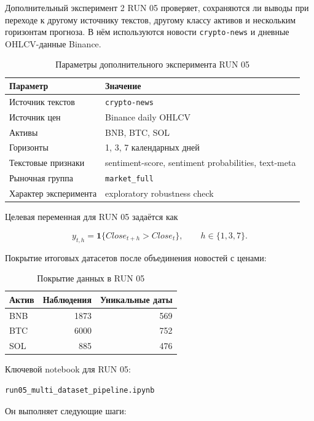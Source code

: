 Дополнительный эксперимент 2 RUN 05 проверяет, сохраняются ли выводы при переходе к другому источнику текстов, другому классу активов и нескольким горизонтам прогноза. В нём используются новости \texttt{crypto-news} и дневные OHLCV-данные Binance.

\begin{table}[htbp]
\centering
\begin{tabular}{ll}
\toprule
Параметр & Значение \\
\midrule
Источник текстов & \texttt{crypto-news} \\
Источник цен & Binance daily OHLCV \\
Активы & BNB, BTC, SOL \\
Горизонты & 1, 3, 7 календарных дней \\
Текстовые признаки & sentiment-score, sentiment probabilities, text-meta \\
Рыночная группа & \texttt{market\_full} \\
Характер эксперимента & exploratory robustness check \\
\bottomrule
\end{tabular}
\caption{Параметры дополнительного эксперимента RUN 05}
\label{tab:appendix_run05_params}
\end{table}

Целевая переменная для RUN 05 задаётся как

\[
y_{t,h}=\mathbf{1}\{Close_{t+h}>Close_t\}, \qquad h \in \{1,3,7\}.
\]

Покрытие итоговых датасетов после объединения новостей с ценами:

\begin{table}[htbp]
\centering
\begin{tabular}{lrr}
\toprule
Актив & Наблюдения & Уникальные даты \\
\midrule
BNB & 1873 & 569 \\
BTC & 6000 & 752 \\
SOL & 885 & 476 \\
\bottomrule
\end{tabular}
\caption{Покрытие данных в RUN 05}
\label{tab:appendix_run05_coverage}
\end{table}

Ключевой notebook для RUN 05:

\begin{Verbatim}[fontsize=\small]
run05_multi_dataset_pipeline.ipynb
\end{Verbatim}

Он выполняет следующие шаги:

